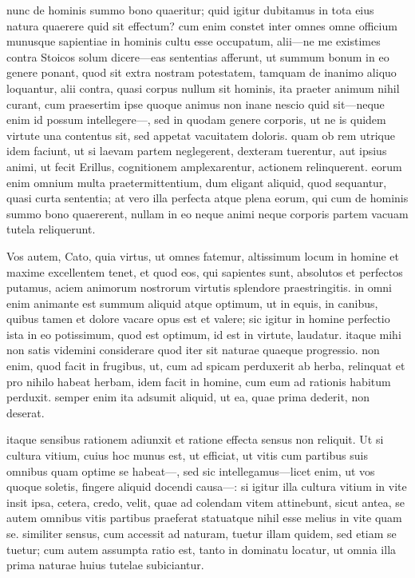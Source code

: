  nunc de hominis summo bono quaeritur; quid igitur dubitamus in tota eius natura quaerere quid sit effectum? cum enim constet inter omnes omne officium munusque sapientiae in hominis cultu esse occupatum, alii—ne me existimes contra Stoicos solum dicere—eas sententias afferunt, ut summum bonum in eo genere ponant, quod sit extra nostram potestatem, tamquam de inanimo aliquo loquantur, alii contra, quasi corpus nullum sit hominis, ita praeter animum nihil curant, cum praesertim ipse quoque animus non inane nescio quid sit—neque enim id possum intellegere—, sed in quodam genere corporis, ut ne is quidem virtute una contentus sit, sed appetat vacuitatem doloris. quam ob rem utrique idem faciunt, ut si laevam partem neglegerent, dexteram tuerentur, aut ipsius animi, ut fecit Erillus, cognitionem amplexarentur, actionem relinquerent. eorum enim omnium multa praetermittentium, dum eligant aliquid, quod sequantur, quasi curta sententia; at vero illa perfecta atque plena eorum, qui cum de hominis summo bono quaererent, nullam in eo neque animi neque corporis partem vacuam tutela reliquerunt.

 Vos autem, Cato, quia virtus, ut omnes fatemur, altissimum locum in homine et maxime excellentem tenet, et quod eos, qui sapientes sunt, absolutos et perfectos putamus, aciem animorum nostrorum virtutis splendore praestringitis. in omni enim animante est summum aliquid atque optimum, ut in equis, in canibus, quibus tamen et dolore vacare opus est et valere; sic igitur in homine perfectio ista in eo potissimum, quod est optimum, id est in virtute, laudatur. itaque mihi non satis videmini considerare quod iter sit naturae quaeque progressio. non enim, quod facit in frugibus, ut, cum ad spicam perduxerit ab herba, relinquat et pro nihilo habeat herbam, idem facit in homine, cum eum ad rationis habitum perduxit. semper enim ita adsumit aliquid, ut ea, quae prima dederit, non deserat.

 itaque sensibus rationem adiunxit et ratione effecta sensus non reliquit. Ut si cultura vitium, cuius hoc munus est, ut efficiat, ut vitis cum partibus suis omnibus quam optime se habeat—, sed sic intellegamus—licet enim, ut vos quoque soletis, fingere aliquid docendi causa—: si igitur illa cultura vitium in vite insit ipsa, cetera, credo, velit, quae ad colendam vitem attinebunt, sicut antea, se autem omnibus vitis partibus praeferat statuatque nihil esse melius in vite quam se. similiter sensus, cum accessit ad naturam, tuetur illam quidem, sed etiam se tuetur; cum autem assumpta ratio est, tanto in dominatu locatur, ut omnia illa prima naturae huius tutelae subiciantur.

